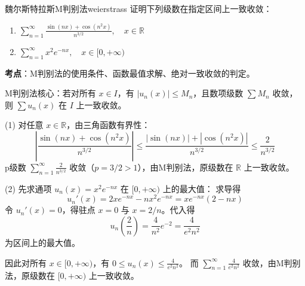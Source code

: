 \documentclass[UTF8,zihao=-4,openany]{ctexbook}
\begin{document}
\begin{example}{魏尔斯特拉斯M判别法}{weierstrass}
\noindent 证明下列级数在指定区间上一致收敛：
\begin{enumerate}
  \item $\displaystyle \sum_{n=1}^{\infty} \frac{\sin(nx) + \cos(n^2 x)}{n^{3/2}},\quad x \in \mathbb{R}$
  \item $\displaystyle \sum_{n=1}^{\infty} x^2 e^{-nx},\quad x \in [0, +\infty)$
\end{enumerate}
\tcblower
\smallskip
\noindent \textbf{考点}：M判别法的使用条件、函数最值求解、绝对一致收敛的判定。


M判别法核心：若对所有 $x \in I$，有 $|u_n(x)| \leq M_n$，且数项级数 $\sum M_n$ 收敛，则 $\sum u_n(x)$ 在 $I$ 上一致收敛。

\medskip
(1) 对任意 $x \in \mathbb{R}$，由三角函数有界性：
$$
\left| \frac{\sin(nx) + \cos(n^2 x)}{n^{3/2}} \right| \leq \frac{|\sin(nx)| + |\cos(n^2 x)|}{n^{3/2}} \leq \frac{2}{n^{3/2}}
$$
p级数 $\sum_{n=1}^\infty \frac{2}{n^{3/2}}$ 收敛（$p=3/2>1$），由M判别法，原级数在 $\mathbb{R}$ 上一致收敛。

\medskip
(2) 先求通项 $u_n(x) = x^2 e^{-nx}$ 在 $[0,+\infty)$ 上的最大值：
求导得
$$
u_n'(x) = 2x e^{-nx} - n x^2 e^{-nx} = x e^{-nx}(2 - nx)
$$
令 $u_n'(x)=0$，得驻点 $x=0$ 与 $x=2/n$。代入得
$$
u_n\left(\frac{2}{n}\right) = \frac{4}{n^2} e^{-2} = \frac{4}{e^2 n^2}
$$
为区间上的最大值。

因此对所有 $x \in [0,+\infty)$，有 $0 \leq u_n(x) \leq \frac{4}{e^2 n^2}$。
而 $\sum_{n=1}^\infty \frac{4}{e^2 n^2}$ 收敛，由M判别法，原级数在 $[0,+\infty)$ 上一致收敛。
\end{example}
\end{document}
